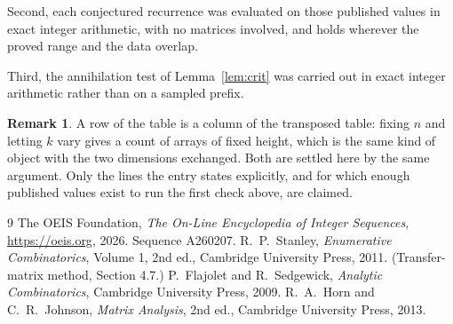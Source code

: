 \documentclass[11pt,a4paper]{article}
\theoremstyle{plain}
\theoremstyle{definition}
\newtheorem{remark}[theorem]{Remark}
\begin{document}
Second, each conjectured recurrence was evaluated on those published values in exact
integer arithmetic, with no matrices involved, and holds wherever the proved range and the
data overlap.

Third, the annihilation test of Lemma~\ref{lem:crit} was carried out in exact integer
arithmetic rather than on a sampled prefix.

\begin{remark}
A row of the table is a column of the transposed table: fixing $n$ and letting $k$ vary gives a
count of arrays of fixed height, which is the same kind of object with the two dimensions
exchanged. Both are settled here by the same argument. Only the lines the entry states
explicitly, and for which enough published values exist to run the first check above, are
claimed.
\end{remark}

\begin{thebibliography}{9}
 The OEIS Foundation, \emph{The On-Line Encyclopedia of Integer
Sequences}, \url{https://oeis.org}, 2026. Sequence A260207.
 R.~P.~Stanley, \emph{Enumerative Combinatorics}, Volume 1, 2nd ed.,
Cambridge University Press, 2011. (Transfer-matrix method, Section 4.7.)
 P.~Flajolet and R.~Sedgewick, \emph{Analytic Combinatorics}, Cambridge
University Press, 2009.
 R.~A.~Horn and C.~R.~Johnson, \emph{Matrix Analysis}, 2nd ed., Cambridge
University Press, 2013.
\end{thebibliography}
\end{document}
